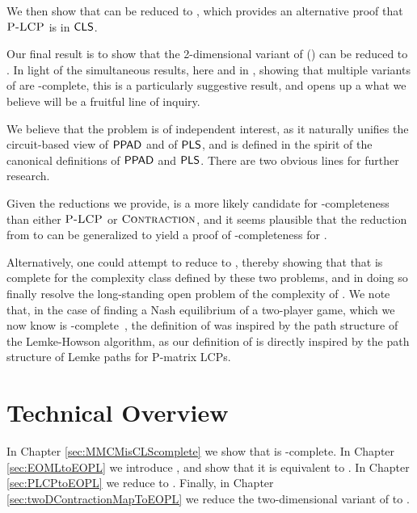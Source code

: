 We then show that \PLCP can be reduced to \EOPL,
which provides an alternative proof that $\textsc{P-LCP}$ is in $\mathsf{CLS}$.

Our final result is to show that the 2-dimensional variant of \CM (\TwoDContractionMap) can be reduced to \EOPL. In light of the simultaneous results, here and in \cite{DTZ17}, showing that multiple variants of \CM are \CLS-complete, this is a particularly suggestive result, and opens up a what we believe will be a fruitful line of inquiry.

We believe that the \EOPL problem is of independent interest, as it naturally
unifies the circuit-based view of $\mathsf{PPAD}$ and of $\mathsf{PLS}$, and is defined
in the spirit of the canonical definitions of $\mathsf{PPAD}$ and $\mathsf{PLS}$.  There
are two obvious lines for further research.

Given the reductions we provide,
\EOPL is a more likely candidate for \CLS-completeness than either $\textsc{P-LCP}$ or $\textsc{Contraction}$, and it seems plausible that the reduction from \TwoDContractionMap to \EOPL can be generalized to yield a proof of \CLS-completeness for \EOPL.

Alternatively, one could attempt to reduce \EOPL to \PLCP, thereby showing that
that \PLCP is complete for the complexity class defined by these two problems,
and in doing so finally resolve the long-standing open problem of the complexity
of \PLCP. We note that, in the case of finding a Nash equilibrium of a two-player game,
which we now know is
\PPAD-complete~\cite{chen2009settling,daskalakis2009complexity}, the definition
of \PPAD was inspired by the path structure of the Lemke-Howson algorithm, as
our definition of \EOPL is directly inspired by the path structure of Lemke
paths for P-matrix LCPs.

\section{Technical Overview}
In Chapter \ref{sec:MMCMisCLScomplete} we show that \MMCM is \CLS-complete. In Chapter \ref{sec:EOMLtoEOPL} we introduce \EOPL, and show that it is equivalent to \EOML. In Chapter \ref{sec:PLCPtoEOPL} we reduce \PLCP to \EOPL. Finally, in Chapter \ref{sec:twoDContractionMapToEOPL} we reduce the two-dimensional variant of \CM to \EOPL.

